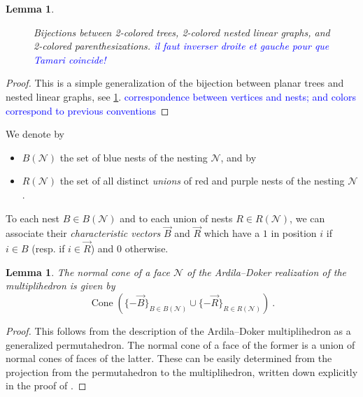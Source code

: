 \documentclass[twoside, 12pt]{amsart}
\newtheorem{lemma}[definition]{Lemma}
\theoremstyle{remark}
\newcommand{\blue}[1]{\textcolor{MidnightBlue}{\textbf{(}} #1 \textcolor{MidnightBlue}{\textbf{)}}}
\newcommand{\red}[1]{\textcolor{BrickRed}{\textbf{(}} #1 \textcolor{BrickRed}{\textbf{)}}}
\newcommand{\purple}[1]{\textcolor{Purple}{\textbf{(}} #1 \textcolor{Purple}{\textbf{)}}}
\DeclareMathOperator{\cone}{Cone} %
\newcommand{\Guillaume}[1]{\textcolor{blue}{#1}}
\begin{document}
\begin{lemma}
\begin{figure}[h!]
{}
\caption{Bijections between 2-colored trees, 2-colored nested linear graphs, and 2-colored parenthesizations. \Guillaume{il faut inverser droite et gauche pour que Tamari coincide!}}
\label{fig:bijections}
\end{figure}
\end{lemma}

\begin{proof}
  This is a simple generalization of the bijection between planar trees and nested linear graphs, see \cref{fig:bijections}. \Guillaume{correspondence between vertices and nests; and colors correspond to previous conventions}
\end{proof}

We denote by 
\begin{itemize}
  \item $B(\mathcal{N})$ the set of blue nests of the nesting $\mathcal{N}$, and by
  \item $R(\mathcal{N})$ the set of all distinct \emph{unions} of red and purple nests of the nesting $\mathcal{N}$.
\end{itemize}

To each nest $B \in B(\mathcal{N})$ and to each union of nests $R \in R(\mathcal{N})$, we can associate their \emph{characteristic vectors} $\vec B$ and $\vec R$ which have a $1$ in position $i$ if $i \in B$ (resp. if $i \in \vec R$) and $0$ otherwise.  

\begin{lemma} \label{lemma:normalcones}
The normal cone of a face $\mathcal{N}$ of the Ardila--Doker realization of the multiplihedron is given by \[\cone\left(\{-\vec B\}_{B \in B(\mathcal{N})} \cup \{-\vec R\}_{R \in R(\mathcal{N})}\right) \ . \]
\end{lemma}

\begin{proof} 
This follows from the description of the Ardila--Doker multiplihedron as a generalized permutahedron. 
The normal cone of a face of the former is a union of normal cones of faces of the latter. 
These can be easily determined from the projection from the permutahedron to the multiplihedron, written down explicitly in the proof of \cite[Theorem 3.3.6]{Doker11}.
\end{proof}
\end{document}
